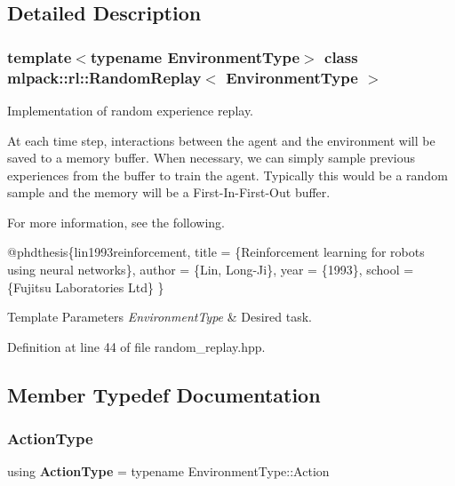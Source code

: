 \subsection{Detailed Description}
\subsubsection*{template$<$typename Environment\+Type$>$\newline
class mlpack\+::rl\+::\+Random\+Replay$<$ Environment\+Type $>$}

Implementation of random experience replay. 

At each time step, interactions between the agent and the environment will be saved to a memory buffer. When necessary, we can simply sample previous experiences from the buffer to train the agent. Typically this would be a random sample and the memory will be a First-\/\+In-\/\+First-\/\+Out buffer.

For more information, see the following.


\begin{DoxyCode}
@phdthesis\{lin1993reinforcement,
 title  = \{Reinforcement learning \textcolor{keywordflow}{for} robots \textcolor{keyword}{using} neural networks\},
 author = \{Lin, Long-Ji\},
 year   = \{1993\},
 school = \{Fujitsu Laboratories Ltd\}
\}
\end{DoxyCode}



\begin{DoxyTemplParams}{Template Parameters}
{\em Environment\+Type} & Desired task. \\
\hline
\end{DoxyTemplParams}


Definition at line 44 of file random\+\_\+replay.\+hpp.



\subsection{Member Typedef Documentation}
\mbox{\label{classmlpack_1_1rl_1_1RandomReplay_aaf7b2dc5d49d01961601c7c16be76777}} 
\subsubsection{Action\+Type}
{\footnotesize\ttfamily using \textbf{ Action\+Type} =  typename Environment\+Type\+::\+Action}



